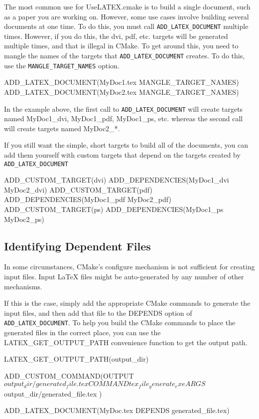\documentclass{article}
\newcommand*{\textfile}[1]{\textsf{#1}}
\newcommand*{\textcmake}[1]{\texttt{#1}}
\newcommand*{\textmaketarget}[1]{#1}
\newcommand*{\UseLATEX}{\textfile{UseLATEX.cmake}\xspace}
\newcommand*{\latex}{\LaTeX\xspace}
\newcommand*{\ald}{\textcmake{ADD\_LATEX\_DOCUMENT}\xspace}
\begin{document}
  The most common use for \UseLATEX is to build a single document, such as
  a paper you are working on. However, some use cases involve building
  several documents at one time. To do this, you must call \ald multiple
  times. However, if you do this, the dvi, pdf, etc. targets will be
  generated multiple times, and that is illegal in CMake.  To get around
  this, you need to mangle the names of the targets that \ald creates. To
  do this, use the \textcmake{MANGLE\_TARGET\_NAMES} option.

  \begin{CodeListing}
ADD_LATEX_DOCUMENT(MyDoc1.tex MANGLE_TARGET_NAMES)
ADD_LATEX_DOCUMENT(MyDoc2.tex MANGLE_TARGET_NAMES)
  \end{CodeListing}

  In the example above, the first call to \ald will create targets named
  \textmaketarget{MyDoc1\_dvi}, \textmaketarget{MyDoc1\_pdf},
  \textmaketarget{MyDoc1\_ps}, etc. whereas the second call will create
  targets named \textmaketarget{MyDoc2\_*}.

  If you still want the simple, short targets to build all of the
  documents, you can add them yourself with custom targets that depend on
  the targets created by \ald

  \begin{CodeListing}
ADD_CUSTOM_TARGET(dvi)
ADD_DEPENDENCIES(MyDoc1_dvi MyDoc2_dvi)
ADD_CUSTOM_TARGET(pdf)
ADD_DEPENDENCIES(MyDoc1_pdf MyDoc2_pdf)
ADD_CUSTOM_TARGET(ps)
ADD_DEPENDENCIES(MyDoc1_ps MyDoc2_ps)
  \end{CodeListing}

  \subsection{Identifying Dependent Files}
  \label{sec:IdentifyingDependentFiles}

  In some circumstances, CMake's configure mechanism is not sufficient for
  creating input files.  Input \latex files might be auto-generated by any
  number of other mechanisms.

  If this is the case, simply add the appropriate CMake commands to
  generate the input files, and then add that file to the DEPENDS option of
  \ald.  To help you build the CMake commands to place the generated files
  in the correct place, you can use the LATEX\_GET\_OUTPUT\_PATH convenience
  function to get the output path.

  \begin{CodeListing}
LATEX_GET_OUTPUT_PATH(output_dir)

ADD_CUSTOM_COMMAND(OUTPUT ${output_dir}/generated_file.tex
  COMMAND tex_file_generate_exe
  ARGS ${output_dir}/generated_file.tex
  )

ADD_LATEX_DOCUMENT(MyDoc.tex DEPENDS generated_file.tex)
  \end{CodeListing}
\end{document}
